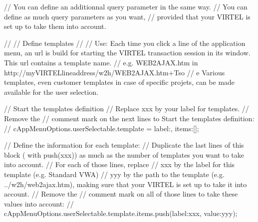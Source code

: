 \documentclass[letterpaper,10pt,english]{sphinxmanual}
\begin{document}
\begin{sphinxVerbatim}[commandchars=\\\{\}]
// You can define an additionnal query parameter in the same way.
// You can define as much query parameters as you want,
// provided that your VIRTEL is set up to take them into account.



//
// Define templates
// \PYGZhy{}\PYGZhy{}\PYGZhy{}\PYGZhy{}\PYGZhy{}\PYGZhy{}\PYGZhy{}\PYGZhy{}\PYGZhy{}\PYGZhy{}\PYGZhy{}\PYGZhy{}\PYGZhy{}\PYGZhy{}\PYGZhy{}\PYGZhy{}
// Use: Each time you click a line of the application menu, an url is build for starting the VIRTEL transaction session in its window.  This url contains a template name.
// e.g. \PYGZdq{}WEB2AJAX.htm\PYGZdq{} in http://my\PYGZhy{}VIRTEL\PYGZhy{}line\PYGZhy{}address/w2h/WEB2AJAX.htm+Tso
// e Various templates, even customer templates in case of specific projets, can be made available for the user selection.

// \PYGZhy{} Start the templates definition
// Replace \PYGZdq{}xxx\PYGZdq{} by your label for templates.
// Remove the // comment mark on the next lines to Start the templates definition:
// cAppMenuOptions.userSelectable.template =  \PYGZob{}\PYGZdq{}label\PYGZdq{}:\PYGZdq{}\PYGZdq{}, \PYGZdq{}items\PYGZdq{}:[]\PYGZcb{};


// \PYGZhy{} Define the information for each template:
// Duplicate the last lines of this block ( with push(\PYGZdq{}xxx\PYGZdq{})) as much as the number of templates you want to take into account.
// For each of those lines, replace
// \PYGZhy{} \PYGZdq{}xxx\PYGZdq{} by the label for this template (e.g. \PYGZdq{}Standard VWA\PYGZdq{})
// \PYGZhy{} \PYGZdq{}yyy\PYGZdq{} by the path to the template (e.g. \PYGZdq{}../w2h/web2ajax.htm\PYGZdq{}), making sure that your VIRTEL is set up to take it into account.
// Remove the // comment mark on all of those lines to take these values into account:
// cAppMenuOptions.userSelectable.template.items.push(\PYGZob{}\PYGZdq{}label\PYGZdq{}:\PYGZdq{}xxx\PYGZdq{}, \PYGZdq{}value\PYGZdq{}:\PYGZdq{}yyy\PYGZdq{}\PYGZcb{});






\end{sphinxVerbatim}
\end{document}
